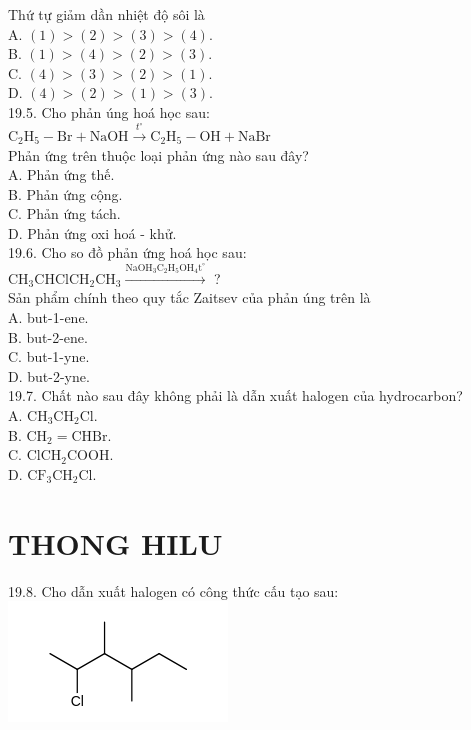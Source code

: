 \documentclass[10pt]{article}
\begin{document}
Thứ tự giảm dần nhiệt độ sôi là\\
A. $(1)>(2)>(3)>(4)$.\\
B. $(1)>(4)>(2)>(3)$.\\
C. $(4)>(3)>(2)>(1)$.\\
D. $(4)>(2)>(1)>(3)$.\\
19.5. Cho phản úng hoá học sau:\\
$\mathrm{C}_{2} \mathrm{H}_{5}-\mathrm{Br}+\mathrm{NaOH} \xrightarrow{t^{\circ}} \mathrm{C}_{2} \mathrm{H}_{5}-\mathrm{OH}+\mathrm{NaBr}$\\
Phản ứng trên thuộc loại phản ứng nào sau đây?\\
A. Phản ứng thế.\\
B. Phản ứng cộng.\\
C. Phản ứng tách.\\
D. Phản ứng oxi hoá - khử.\\
19.6. Cho so đồ phản ứng hoá học sau:\\
$\mathrm{CH}_{3} \mathrm{CHClCH}_{2} \mathrm{CH}_{3} \xrightarrow{\mathrm{NaOH}_{3} \mathrm{C}_{2} \mathrm{H}_{5} \mathrm{OH}_{4} \mathrm{t}^{\circ}}$ ?\\
Sản phẩm chính theo quy tắc Zaitsev của phản úng trên là\\
A. but-1-ene.\\
B. but-2-ene.\\
C. but-1-yne.\\
D. but-2-yne.\\
19.7. Chất nào sau đây không phải là dẫn xuất halogen của hydrocarbon?\\
A. $\mathrm{CH}_{3} \mathrm{CH}_{2} \mathrm{Cl}$.\\
B. $\mathrm{CH}_{2}=\mathrm{CHBr}$.\\
C. $\mathrm{ClCH}_{2} \mathrm{COOH}$.\\
D. $\mathrm{CF}_{3} \mathrm{CH}_{2} \mathrm{Cl}$.

\section*{THONG HILU}
19.8. Cho dẫn xuất halogen có công thức cấu tạo sau:\\
\includegraphics{smile-1f2915d88567dae8b01377510c65280023e96568}
\end{document}
